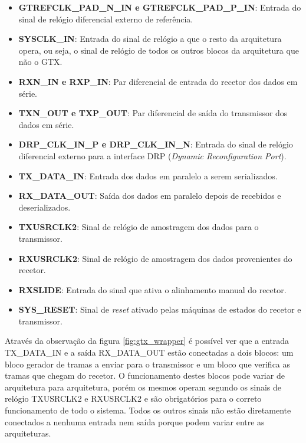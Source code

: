 \begin{itemize}
	\item \textbf{GTREFCLK\_PAD\_N\_IN e GTREFCLK\_PAD\_P\_IN}:  Entrada do sinal de relógio diferencial externo de referência.
	
	\item \textbf{SYSCLK\_IN}: Entrada do sinal de relógio a que o resto da arquitetura opera, ou seja, o sinal de relógio de todos os outros blocos da arquitetura que não o GTX.
	
	\item \textbf{RXN\_IN e RXP\_IN}: Par diferencial de entrada do recetor  dos dados em série.
	
	\item \textbf{TXN\_OUT e TXP\_OUT}: Par diferencial de saída do transmissor dos dados em série.

	\item \textbf{DRP\_CLK\_IN\_P e DRP\_CLK\_IN\_N}: Entrada do sinal de relógio diferencial externo para a interface DRP (\textit{Dynamic Reconfiguration Port}). 
	
	\item \textbf{TX\_DATA\_IN}: Entrada dos dados em paralelo a serem serializados.
	
	\item \textbf{RX\_DATA\_OUT}: Saída dos dados em paralelo depois de recebidos e deserializados. 
	
	\item \textbf{TXUSRCLK2}: Sinal de relógio de amostragem dos dados para o transmissor.
	
	\item \textbf{RXUSRCLK2}: Sinal de relógio de amostragem dos dados provenientes do recetor.
	
	\item \textbf{RXSLIDE}: Entrada do sinal que ativa o alinhamento manual do recetor.
	
	\item \textbf{SYS\_RESET}: Sinal de \textit{reset} ativado pelas máquinas de estados do recetor e transmissor.
	
\end{itemize}

Através da observação da figura \ref{fig:gtx_wrapper} é possível ver que a entrada TX\_DATA\_IN e a saída RX\_DATA\_OUT estão conectadas a dois blocos: um bloco gerador de tramas a enviar para o transmissor e um bloco que verifica as tramas que chegam do recetor. O funcionamento destes blocos pode variar de arquitetura para arquitetura, porém os mesmos operam segundo os sinais de relógio TXUSRCLK2 e RXUSRCLK2 e são obrigatórios para o correto funcionamento de todo o sistema. Todos os outros sinais não estão diretamente conectados a nenhuma entrada nem saída porque podem variar entre as arquiteturas.

